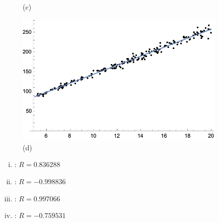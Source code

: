 \documentclass[11pt,letterpaper]{article}
\begin{document}
\begin{figure}[!ht]
\begin{minipage}{0.45\textwidth}
	   \caption*{(c)}
	\end{minipage}
	\begin{minipage}{0.45\textwidth}
	   \centering
	   \includegraphics[width=0.9\textwidth]{reg4.png}
	   \caption*{(d)}
	\end{minipage}
	\end{figure}

\begin{enumerate}[(i)]
\item {}: $R= 0.836288$
\item {}: $R= -0.998836$
\item {}: $R= 0.997066$
\item{}: $R= -0.759531$
\end{enumerate} 
\end{document}
